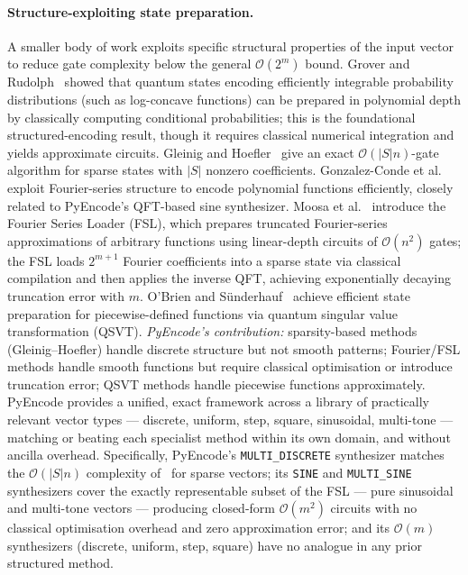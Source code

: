 \documentclass[10pt,twocolumn]{article}
\begin{document}
\paragraph{Structure-exploiting state preparation.}
A smaller body of work exploits specific structural properties of the
input vector to reduce gate complexity below the general $\mathcal{O}(2^m)$
bound.
Grover and Rudolph~\cite{grover2002} showed that quantum states
encoding efficiently integrable probability distributions (such as
log-concave functions) can be prepared in polynomial depth by
classically computing conditional probabilities; this is the
foundational structured-encoding result, though it requires
classical numerical integration and yields approximate circuits.
Gleinig and Hoefler~\cite{gleinig2021} give an exact
$\mathcal{O}(|S|n)$-gate algorithm for sparse states with $|S|$
nonzero coefficients.
Gonzalez-Conde et al.~\cite{gonzalezconde2024} exploit Fourier-series
structure to encode polynomial functions efficiently, closely related
to PyEncode's QFT-based sine synthesizer.
Moosa et al.~\cite{moosa2024} introduce the Fourier Series Loader
(FSL), which prepares truncated Fourier-series approximations of
arbitrary functions using linear-depth circuits of $\mathcal{O}(n^2)$
gates; the FSL loads $2^{m+1}$ Fourier coefficients into a sparse
state via classical compilation and then applies the inverse QFT,
achieving exponentially decaying truncation error with $m$.
O'Brien and S\"{u}nderhauf~\cite{obrien2025} achieve efficient state
preparation for piecewise-defined functions via quantum singular value
transformation (QSVT).
\emph{PyEncode's contribution:}
sparsity-based methods (Gleinig--Hoefler) handle discrete structure
but not smooth patterns; Fourier/FSL methods handle smooth functions
but require classical optimisation or introduce truncation error;
QSVT methods handle piecewise functions approximately.
PyEncode provides a unified, exact framework across a library of
practically relevant vector types --- discrete, uniform, step, square,
sinusoidal, multi-tone --- matching or beating each specialist method
within its own domain, and without ancilla overhead.
Specifically, PyEncode's \texttt{MULTI\_DISCRETE} synthesizer matches
the $\mathcal{O}(|S|n)$ complexity of~\cite{gleinig2021} for sparse
vectors; its \texttt{SINE} and \texttt{MULTI\_SINE} synthesizers cover
the exactly representable subset of the FSL --- pure sinusoidal and
multi-tone vectors --- producing closed-form $\mathcal{O}(m^2)$
circuits with no classical optimisation overhead and zero approximation
error; and its $\mathcal{O}(m)$ synthesizers (discrete, uniform, step,
square) have no analogue in any prior structured method.
\end{document}
